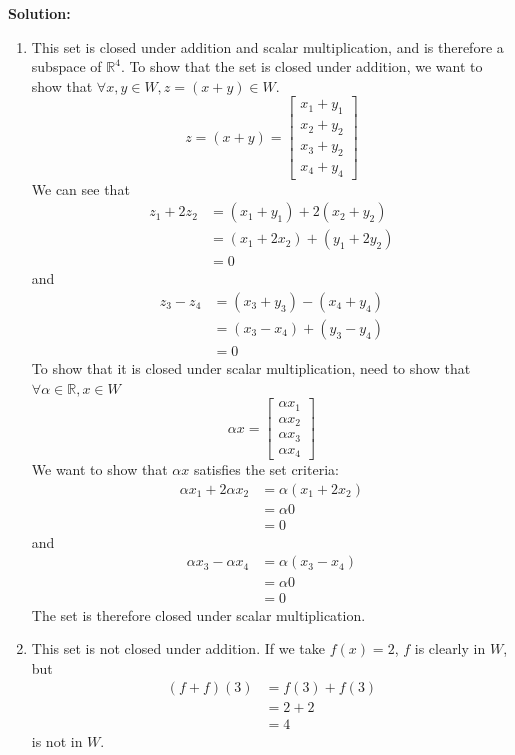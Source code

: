 \documentclass[]{article}
\newcommand{\R}{\mathbb{R}}
\newcommand{\bbm}{\begin{bmatrix}}
\newcommand{\ebm}{\end{bmatrix}}
\newcommand{\solution}{\vskip 0.5cm \textbf{\large Solution:} \\}
\begin{document}
\begin{enumerate}[resume]
	  \solution

	  \begin{enumerate}
	  \item This set is closed under addition and scalar
        multiplication, and is therefore a subspace of $\R^4$. To show
        that the set is closed under addition, we want to show that
        $\forall x,y \in W, z = (x + y) \in W$.
        \[
        z = (x + y) = \bbm x_1 + y_1 \\ x_2 + y_2 \\ x_3 + y_2 \\ x_4 + y_4 \ebm
        \]
        We can see that
        \[\begin{split}
        z_1 + 2z_2 &= (x_1 + y_1) + 2(x_2 + y_2) \\
        &= (x_1 + 2x_2) + (y_1 + 2y_2) \\
        &= 0
        \end{split}\]
        and
        \[\begin{split}
        z_3 - z_4 &= (x_3 + y_3) - (x_4 + y_4) \\
        &= (x_3 - x_4) + (y_3 - y_4) \\
        &= 0
        \end{split}\]
        To show that it is closed under scalar multiplication, need to
        show that $\forall \alpha \in \R, x \in W$
        \[
        \alpha x = \bbm \alpha x_1 \\ \alpha x_2 \\ \alpha x_3 \\ \alpha x_4 \ebm
        \]
        We want to show that $\alpha x$ satisfies the set criteria:
        \[\begin{split}
        \alpha x_1 + 2 \alpha x_2 &= \alpha (x_1 + 2 x_2) \\
        &= \alpha 0 \\
        &= 0
        \end{split}\]
        and
        \[\begin{split}
        \alpha x_3 - \alpha x_4 &= \alpha (x_3 - x_4) \\
        &= \alpha 0 \\
        &= 0
        \end{split}\]
        The set is therefore closed under scalar multiplication.
        
	  \item This set is not closed under addition. If we take $f(x) =
        2$, $f$ is clearly in $W$, but
        \[\begin{split}
        (f + f)(3) &= f(3) + f(3) \\
        &= 2 + 2 \\
        &= 4
        \end{split} \]
        is not in $W$.
        

\end{enumerate}
\end{enumerate}
\end{document}
